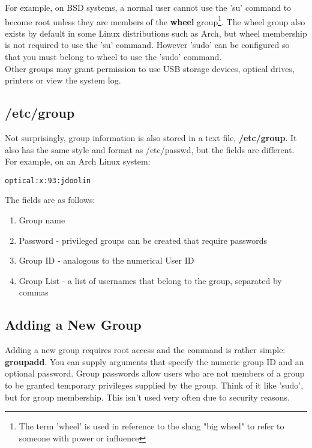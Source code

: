 For example, on BSD systems, a normal user cannot use the 'su' command to become root unless they are members of the \textbf{wheel} group\footnote{The term 'wheel' is used in reference to the slang "big wheel" to refer to someone with power or influence}.  The wheel group also exists by default in some Linux distributions such as Arch, but wheel membership is not required to use the 'su' command.  However 'sudo' can be configured so that you must belong to wheel to use the 'sudo' command.\\

Other groups may grant permission to use USB storage devices, optical drives, printers or view the system log.

\subsection{/etc/group}

Not surprisingly, group information is also stored in a text file, \textbf{/etc/group}.  It also has the same style and format as /etc/passwd, but the fields are different. For example, on an Arch Linux system:

\begin{verbatim}
optical:x:93:jdoolin
\end{verbatim}

The fields are as follows:

\begin{enumerate}
\item Group name
\item Password - privileged groups can be created that require passwords
\item Group ID - analogous to the numerical User ID
\item Group List - a list of usernames that belong to the group, separated by commas
\end{enumerate}

\subsection{Adding a New Group}

Adding a new group requires root access and the command is rather simple: \textbf{groupadd}.  You can supply arguments that specify the numeric group ID and an optional password.  Group passwords allow users who are not members of a group to be granted temporary privileges supplied by the group.  Think of it like 'sudo', but for group membership.  This isn't used very often due to security reasons.\\


